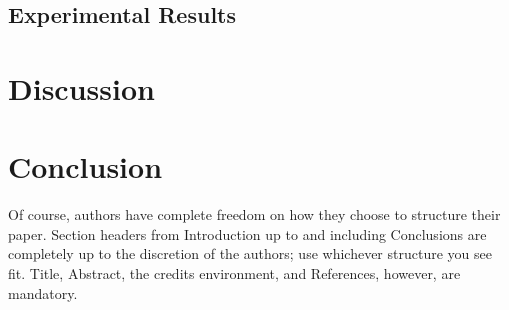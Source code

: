 \documentclass[runningheads]{llncs}
\begin{document}
\subsection{Experimental Results}
\label{sec:cross-validation}

\section{Discussion}

\section{Conclusion}

Of course, authors have complete freedom on how they choose to structure their paper. Section headers from Introduction up to and including Conclusions are completely up to the discretion of the authors; use whichever structure you see fit. Title, Abstract, the credits environment, and References, however, are mandatory.
\end{document}
